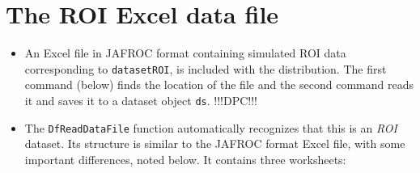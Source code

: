 \documentclass[]{book}
\newenvironment{Shaded}{\begin{snugshade}}{\end{snugshade}}
\newcommand{\CommentTok}[1]{\textcolor[rgb]{0.56,0.35,0.01}{\textit{#1}}}
\providecommand{\tightlist}{%
  \setlength{\itemsep}{0pt}\setlength{\parskip}{0pt}}
\begin{document}
\hypertarget{the-roi-excel-data-file}{%
\section{The ROI Excel data file}\label{the-roi-excel-data-file}}

\begin{itemize}
\tightlist
\item
  An Excel file in JAFROC format containing simulated ROI data corresponding to \texttt{datasetROI}, is included with the distribution. The first command (below) finds the location of the file and the second command reads it and saves it to a dataset object \texttt{ds}. !!!DPC!!!
\item
  The \texttt{DfReadDataFile} function automatically recognizes that this is an \emph{ROI} dataset. Its structure is similar to the JAFROC format Excel file, with some important differences, noted below. It contains three worksheets:
\end{itemize}

\begin{Shaded}
\end{Shaded}
\end{document}
